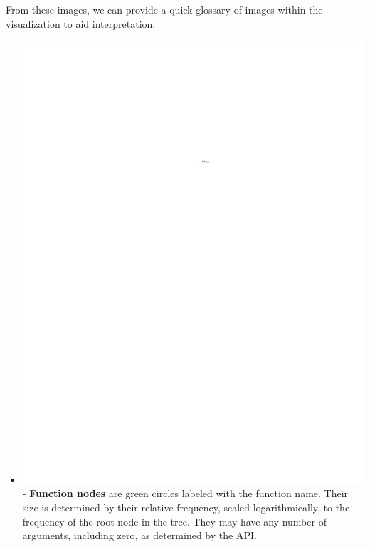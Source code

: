 \documentclass[conference]{IEEEtran}
\begin{document}
	From these images, we can provide a quick glossary of images within the
	visualization to aid interpretation. \begin{itemize} \item
		\includegraphics{glossary-green} - \textbf{Function nodes} are green circles
		labeled with the function name. Their size is determined by their relative
		frequency, scaled logarithmically, to the frequency of the root node in the
		tree. They may have any number of arguments, including zero, as determined by
		the API.
		

\end{itemize}
\end{document}
